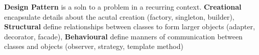\documentclass[10pt, landscape]{article}
\begin{document}
\begin{multicols}{4}
\textbf{Design Pattern} is a soln to a problem in a recurring context. \textbf{Creational} encapsulate details about the acutal creation (factory, singleton, builder), \textbf{Structural} define relationships between classes to form larger objects (adapter, decorator, facade), \textbf{Behavioural} define manners of communication between classes and objects (observer, strategy, template method)\\


\end{multicols}
\end{document}
